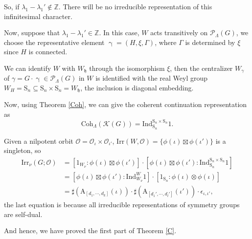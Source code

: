 \documentclass[12pt, a4paper]{amsart}
\numberwithin{equation}{section}
\newcommand{\BZ}{{\mathbb {Z}}}
\newcommand{\CK}{{\mathcal {K}}}
\newcommand{\CO}{{\mathcal {O}}}
\newcommand{\CP}{{\mathcal {P}}}
\newcommand{\fh}{\mathfrak{h}}
\newcommand{\A}{{\mathrm{A}}}
\newcommand{\Ind}{{\mathrm{Ind}}}
\newcommand{\Irr}{{\mathrm{Irr}}}
\begin{document}
So, if $\lambda_1 - \lambda_1' \notin \BZ$. There will be no irreducible representation of this infinitesimal character.  

Now, suppose that $\lambda_1 - \lambda_1' \in \BZ$. In this case, $W$ acts transitively on $\CP_{\Lambda}(G)$, we choose the representative element $\upgamma = (H,\xi, \Gamma)$, where $\Gamma$ is determined by $\xi$ since $H$ is connected.

We can identify $W$ with $W_\fh$ through the isomorphism $\xi$, then the centralizer $W_{{\gamma}}$ of ${\gamma} = G \cdot \upgamma \in \CP_{\Lambda}(G)$ in $W$ is identified with the real Weyl group $W_{H} = \mathrm{S}_n \subseteq \mathrm{S}_n \times \mathrm{S}_n = W_{\fh}$, the inclusion is diagonal embedding.

Now, using Theorem \ref{Coh}, we can give the coherent continuation representation as 
\begin{equation}
    \mathrm{Coh}_{\Lambda}(\CK(G)) = \Ind^{\mathrm{S}_n \times \mathrm{S}_n}_{\mathrm{S}_n}1.
\end{equation}

Given a nilpotent orbit $\CO = \CO_{\iota} \times \CO_{\iota'}$, $\Irr(W,\CO) = \{\phi(\iota) \boxtimes \phi(\iota')\}$ is a singleton, so
\begin{align}
    \Irr_{\nu}(G;\CO) & = [1_{W_\nu}:\phi(\iota) \boxtimes \phi(\iota')]\cdot[\phi(\iota)\boxtimes \phi(\iota'):\Ind^{\mathrm{S}_n \times \mathrm{S}_n}_{\mathrm{S}_n}1]\\
    & = [\phi(\iota)\boxtimes \phi(\iota'):\Ind_{W_\nu}^{W}1] \cdot [1_{\mathrm{S}_n}:\phi(\iota) \otimes \phi(\iota)]\\
    & = \sharp(\A_{[d_1,\cdots,d_k]}(\iota)) \cdot \sharp(\A_{[d_1',\cdots,d_l']}(\iota')) \cdot \epsilon_{\iota,\iota'},
\end{align}
the last equation is because all irreducible representations of symmetry groups are self-dual.

And hence, we have proved the first part of Theorem \ref{C}.
\end{document}
